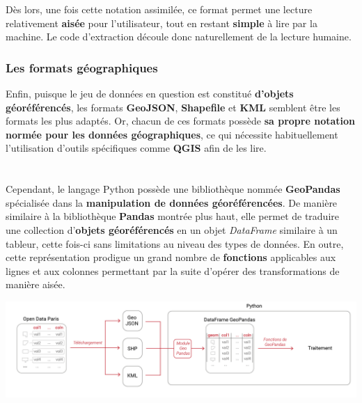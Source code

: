\documentclass[
  11pt,
  french,
]{article}
\newcounter{customfigs}[section]
\newenvironment{customfigs}[1][] {
    \stepcounter{customfigs}
    Fig \arabic{section}. \arabic{customfigs} : }
\newcommand{\masked}{\vspace*{-\baselineskip}}
\begin{document}
\hfill\break
\hfill\break
Dès lors, une fois cette notation assimilée, ce format permet une
lecture relativement \textbf{aisée} pour l'utilisateur, tout en restant
\textbf{simple} à lire par la machine. Le code d'extraction découle donc
naturellement de la lecture humaine.

\newpage

\hypertarget{les-formats-guxe9ographiques}{%
\subsubsection{Les formats
géographiques}\label{les-formats-guxe9ographiques}}

Enfin, puisque le jeu de données en question est constitué
\textbf{d'objets géoréférencés}, les formats \textbf{GeoJSON},
\textbf{Shapefile} et \textbf{KML} semblent être les formats les plus
adaptés. Or, chacun de ces formats possède \textbf{sa propre notation
normée pour les données géographiques}, ce qui nécessite habituellement
l'utilisation d'outils spécifiques comme \textbf{QGIS} afin de les
lire.\\
~\\
~\\
Cependant, le langage Python possède une bibliothèque nommée
\textbf{GeoPandas} spécialisée dans la \textbf{manipulation de données
géoréférencées}. De manière similaire à la bibliothèque \textbf{Pandas}
montrée plus haut, elle permet de traduire une collection
d'\textbf{objets géoréférencés} en un objet \emph{DataFrame} similaire à
un tableur, cette fois-ci sans limitations au niveau des types de
données. En outre, cette représentation prodigue un grand nombre de
\textbf{fonctions} applicables aux lignes et aux colonnes permettant par
la suite d'opérer des transformations de manière aisée.

\begin{tcolorbox}[title=\begin{customfigs} Chargement du jeu de données sous un format géographique dans Python \end{customfigs}]

\begin{center}\includegraphics[width=1\linewidth]{__imgs/io_gpd} \end{center}

\end{tcolorbox}
\end{document}
